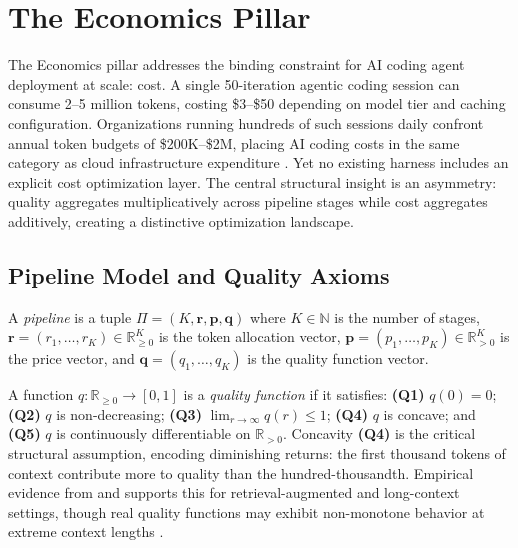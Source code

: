 \section{The Economics Pillar}
\label{sec:economics}

The Economics pillar addresses the binding constraint for AI coding agent deployment at scale: cost. A single 50-iteration agentic coding session can consume 2--5 million tokens, costing \$3--\$50 depending on model tier and caching configuration. Organizations running hundreds of such sessions daily confront annual token budgets of \$200K--\$2M, placing AI coding costs in the same category as cloud infrastructure expenditure \citep{finops2023}. Yet no existing harness includes an explicit cost optimization layer. The central structural insight is an asymmetry: quality aggregates multiplicatively across pipeline stages while cost aggregates additively, creating a distinctive optimization landscape.

\subsection{Pipeline Model and Quality Axioms}

\begin{definition}[Pipeline]
\label{def:econ-pipeline}
A \emph{pipeline} is a tuple $\Pi = (K, \mathbf{r}, \mathbf{p}, \mathbf{q})$ where $K \in \mathbb{N}$ is the number of stages, $\mathbf{r} = (r_1, \ldots, r_K) \in \mathbb{R}_{\geq 0}^K$ is the token allocation vector, $\mathbf{p} = (p_1, \ldots, p_K) \in \mathbb{R}_{> 0}^K$ is the price vector, and $\mathbf{q} = (q_1, \ldots, q_K)$ is the quality function vector.
\end{definition}

A function $q: \mathbb{R}_{\geq 0} \to [0,1]$ is a \emph{quality function} if it satisfies: \textbf{(Q1)} $q(0) = 0$; \textbf{(Q2)} $q$ is non-decreasing; \textbf{(Q3)} $\lim_{r \to \infty} q(r) \leq 1$; \textbf{(Q4)} $q$ is concave; and \textbf{(Q5)} $q$ is continuously differentiable on $\mathbb{R}_{>0}$. Concavity \textbf{(Q4)} is the critical structural assumption, encoding diminishing returns: the first thousand tokens of context contribute more to quality than the hundred-thousandth. Empirical evidence from \citep{gao2025context} and \citep{liu2024lost} supports this for retrieval-augmented and long-context settings, though real quality functions may exhibit non-monotone behavior at extreme context lengths \citep{chroma2025rot}.

